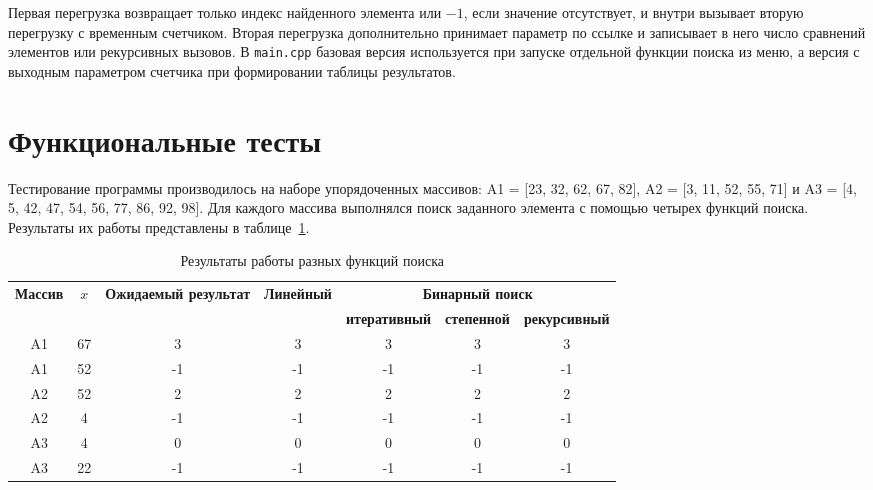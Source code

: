 Первая перегрузка возвращает только индекс найденного 
элемента или $-1$, если значение отсутствует, и внутри 
вызывает вторую перегрузку с временным счетчиком. 
Вторая перегрузка дополнительно принимает параметр по 
ссылке и записывает в него число 
сравнений элементов или рекурсивных вызовов. В \texttt{main.cpp} 
базовая версия используется при запуске отдельной
функции поиска из меню, а версия с выходным параметром 
счетчика при формировании таблицы результатов.

\section{Функциональные тесты}

Тестирование программы производилось на наборе упорядоченных 
массивов: A1 = [23, 32, 62, 67, 82], A2 = [3, 11, 52, 55, 71] и
A3 = [4, 5, 42, 47, 54, 56, 77, 86, 92, 98]. Для каждого массива
выполнялся поиск заданного элемента с помощью четырех функций
поиска. Результаты их работы представлены в 
таблице~\ref{tab:search_results}.

\begin{table}[h!]
    \centering
    \small
    \setlength{\tabcolsep}{4pt}
    \begin{threeparttable}
        \caption{Результаты работы разных функций поиска}
        \label{tab:search_results}
        \begin{tabular}{|c|c|c|c|c|c|c|}
            \hline
            \multirow{2}{*}{\textbf{Массив}} & \multirow{2}{*}{\textbf{$x$}} & \multirow{2}{*}{\textbf{Ожидаемый результат}} & \multirow{2}{*}{\textbf{Линейный}} & \multicolumn{3}{c|}{\textbf{Бинарный поиск}} \\
            \cline{5-7}
             & & & & \textbf{итеративный} & \textbf{степенной} & \textbf{рекурсивный} \\
            \hline
            A1 & 67 & 3 & 3 & 3 & 3 & 3 \\
            \hline
            A1 & 52 & -1 & -1 & -1 & -1 & -1 \\
            \hline
            A2 & 52 & 2 & 2 & 2 & 2 & 2 \\
            \hline
            A2 & 4 & -1 & -1 & -1 & -1 & -1 \\
            \hline
            A3 & 4 & 0 & 0 & 0 & 0 & 0 \\
            \hline
            A3 & 22 & -1 & -1 & -1 & -1 & -1 \\
            \hline
        \end{tabular}
    \end{threeparttable}
\end{table}

